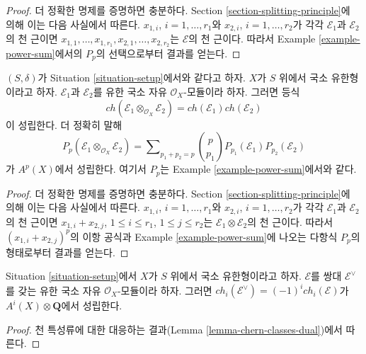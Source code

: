 \begin{proof}
더 정확한 명제를 증명하면 충분하다. Section
\ref{section-splitting-principle}에 의해 이는 다음 사실에서 따른다.
$x_{1, i}$, $i = 1, \ldots, r_1$와
$x_{2, i}$, $i = 1, \ldots, r_2$가 각각
$\mathcal{E}_1$과 $\mathcal{E}_2$의 천 근이면
$x_{1, 1}, \ldots, x_{1, r_1}, x_{2, 1}, \ldots, x_{2, r_2}$는
$\mathcal{E}$의 천 근이다. 따라서 Example
\ref{example-power-sum}에서의 $P_p$의 선택으로부터 결과를 얻는다.
\end{proof}

\begin{lemma}
\label{lemma-chern-character-multiplicative}
$(S, \delta)$가 Situation \ref{situation-setup}에서와 같다고 하자.
$X$가 $S$ 위에서 국소 유한형이라고 하자.
$\mathcal{E}_1$과 $\mathcal{E}_2$를 유한 국소 자유
$\mathcal{O}_X$-모듈이라 하자. 그러면 등식
$$
ch(\mathcal{E}_1 \otimes_{\mathcal{O}_X} \mathcal{E}_2) =
ch(\mathcal{E}_1) ch(\mathcal{E}_2)
$$
이 성립한다. 더 정확히 말해
$$
P_p(\mathcal{E}_1 \otimes_{\mathcal{O}_X} \mathcal{E}_2) =
\sum\nolimits_{p_1 + p_2 = p}
{p \choose p_1} P_{p_1}(\mathcal{E}_1) P_{p_2}(\mathcal{E}_2)
$$
가 $A^p(X)$에서 성립한다. 여기서 $P_p$는 Example
\ref{example-power-sum}에서와 같다.
\end{lemma}

\begin{proof}
더 정확한 명제를 증명하면 충분하다. Section
\ref{section-splitting-principle}에 의해 이는 다음 사실에서 따른다.
$x_{1, i}$, $i = 1, \ldots, r_1$와
$x_{2, i}$, $i = 1, \ldots, r_2$가 각각
$\mathcal{E}_1$과 $\mathcal{E}_2$의 천 근이면
$x_{1, i} + x_{2, j}$, $1 \leq i \leq r_1$,
$1 \leq j \leq r_2$는
$\mathcal{E}_1 \otimes \mathcal{E}_2$의 천 근이다. 따라서
$(x_{1, i} + x_{2, j})^p$의 이항 공식과 Example
\ref{example-power-sum}에 나오는 다항식 $P_p$의 형태로부터 결과를
얻는다.
\end{proof}

\begin{lemma}
\label{lemma-chern-character-dual}
Situation \ref{situation-setup}에서 $X$가 $S$ 위에서 국소 유한형이라고
하자. $\mathcal{E}$를 쌍대 $\mathcal{E}^\vee$를 갖는 유한 국소 자유
$\mathcal{O}_X$-모듈이라 하자. 그러면
$ch_i(\mathcal{E}^\vee) = (-1)^i ch_i(\mathcal{E})$가
$A^i(X) \otimes \mathbf{Q}$에서 성립한다.
\end{lemma}

\begin{proof}
천 특성류에 대한 대응하는 결과(Lemma
\ref{lemma-chern-classes-dual})에서 따른다.
\end{proof}











